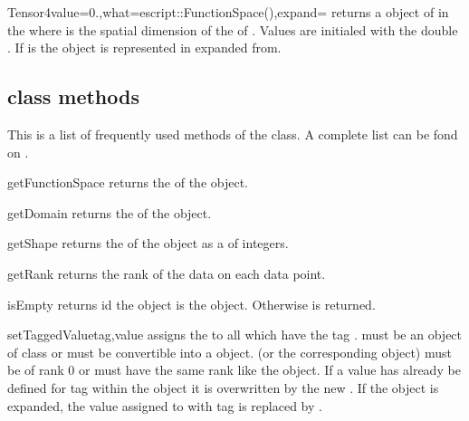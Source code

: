 \begin{funcdesc}{Tensor4}{value=0.,what=escript::FunctionSpace(),expand=\False}
returns a \Data object of \Shape {} in the \FunctionSpace {} 
where  is the spatial dimension of the \Domain of .
Values are initialed with the double . If  is \True
the \Data object is represented in expanded from.
\end{funcdesc}

\subsection{\Data class methods}
This is a list of frequently used methods of the 
\Data class. A complete list can be fond on \ReferenceGuide.
\begin{methoddesc}[Data]{getFunctionSpace}{}
returns the \FunctionSpace of the object.
\end{methoddesc}

\begin{methoddesc}[Data]{getDomain}{}
returns the \Domain  of the object.
\end{methoddesc}

\begin{methoddesc}[Data]{getShape}{}
returns the \Shape  of the object as a  of
integers.
\end{methoddesc}

\begin{methoddesc}[Data]{getRank}{}
returns the rank of the data on each data point. 
\end{methoddesc}

\begin{methoddesc}[Data]{isEmpty}{}
returns \True id the \Data object is the \EmptyData object.
Otherwise \False is returned.
\end{methoddesc}

\begin{methoddesc}[Data]{setTaggedValue}{tag,value}
assigns the  to all \DataSamplePoints which have the tag
.  must be an object of class
 or must be convertible into a
 object.  (or the corresponding
 object) must be of rank $0$ or must have the
same rank like the object.
If a value has already be defined for tag  within the object
it is overwritten by the new .  If the object is expanded,
the value assigned to \DataSamplePoints with tag  is replaced by
.
\end{methoddesc}

